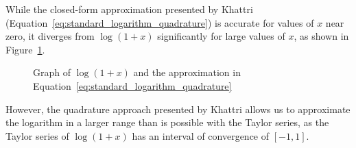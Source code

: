 While the closed-form approximation presented by Khattri (Equation~\ref{eq:standard_logarithm_quadrature}) is accurate for values of $x$ near zero, it diverges from $\log{\left(1+x\right)}$ significantly for large values of $x$, as shown in Figure~\ref{fig:standard_logarithm_quadrature}.
\begin{figure}[!ht]
	\centering
	\caption{Graph of $\log{\left(1+x\right)}$ and the approximation in Equation~\ref{eq:standard_logarithm_quadrature}}
	\label{fig:standard_logarithm_quadrature}
\end{figure}

However, the quadrature approach presented by Khattri allows us to approximate the logarithm in a larger range than is possible with the Taylor series, as the Taylor series of $\log\left(1+x\right)$ has an interval of convergence of $[-1,1]$.

